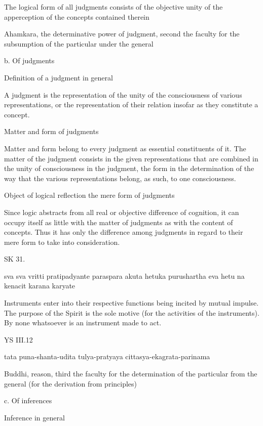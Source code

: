     The logical form of all judgments consists of the objective unity of
    the apperception of the concepts contained therein

    Ahamkara, the determinative power of judgment,
    second the faculty for the subsumption of
    the particular under the general

    b. Of judgments

    Definition of a judgment in general

        A judgment is the representation of the unity of
        the consciousness of various representations,
        or the representation of their relation
        insofar as they constitute a concept.

    Matter and form of judgments

        Matter and form belong to every judgment
        as essential constituents of it.
        The matter of the judgment consists in
        the given representations that are combined
        in the unity of consciousness in the judgment,
        the form in the determination of the way that
        the various representations belong, as such,
        to one consciousness.

    Object of logical reflection the mere form of judgments

        Since logic abstracts from all real or objective
        difference of cognition,
        it can occupy itself as little with the matter of judgments
        as with the content of concepts.
        Thus it has only the difference among judgments
        in regard to their mere form to take into consideration.

SK 31.

sva sva vritti pratipadyante paraspara akuta hetuka
purushartha eva hetu na kenacit karana karyate

Instruments enter into their respective functions
being incited by mutual impulse.
The purpose of the Spirit is the sole motive
(for the activities of the instruments).
By none whatsoever is an instrument made to act.

YS III.12

    tata puna-shanta-udita tulya-pratyaya cittasya-ekagrata-parinama

    Buddhi, reason, third the faculty for the determination of
    the particular from the general (for the derivation from principles)

    c. Of inferences

    Inference in general


